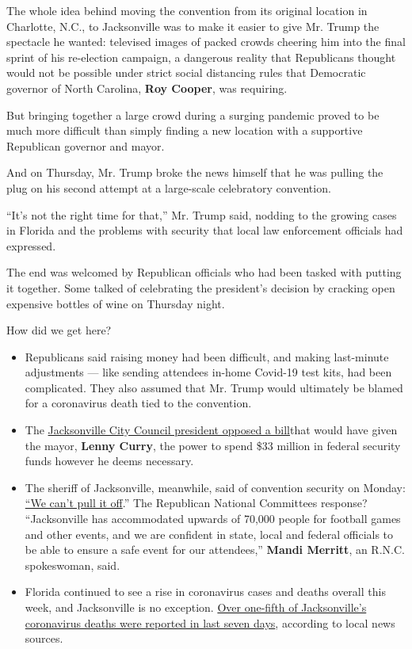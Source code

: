 The whole idea behind moving the convention from its original location
in Charlotte, N.C., to Jacksonville was to make it easier to give Mr.
Trump the spectacle he wanted: televised images of packed crowds
cheering him into the final sprint of his re-election campaign, a
dangerous reality that Republicans thought would not be possible under
strict social distancing rules that Democratic governor of North
Carolina, \textbf{Roy Cooper}, was requiring.

But bringing together a large crowd during a surging pandemic proved to
be much more difficult than simply finding a new location with a
supportive Republican governor and mayor.

And on Thursday, Mr. Trump broke the news himself that he was pulling
the plug on his second attempt at a large-scale celebratory convention.

``It's not the right time for that,'' Mr. Trump said, nodding to the
growing cases in Florida and the problems with security that local law
enforcement officials had expressed.

The end was welcomed by Republican officials who had been tasked with
putting it together. Some talked of celebrating the president's decision
by cracking open expensive bottles of wine on Thursday night.

How did we get here?

\begin{itemize}
\item
  Republicans said raising money had been difficult, and making
  last-minute adjustments --- like sending attendees in-home Covid-19
  test kits, had been complicated. They also assumed that Mr. Trump
  would ultimately be blamed for a coronavirus death tied to the
  convention.
\item
  The
  \href{https://www.jacksonville.com/news/20200722/rnc-plans-in-jeopardy-as-jacksonville-council-president-opposes-city-bill}{Jacksonville
  City Council president opposed a bill}that would have given the mayor,
  \textbf{Lenny Curry}, the power to spend \$33 million in federal
  security funds however he deems necessary.
\item
  The sheriff of Jacksonville, meanwhile, said of convention security on
  Monday:
  \href{https://www.politico.com/states/florida/story/2020/07/20/we-cant-pull-it-off-florida-sheriff-says-he-cant-muster-security-for-gop-convention-1302359}{``We
  can't pull it off}.'' The Republican National Committees response?
  ``Jacksonville has accommodated upwards of 70,000 people for football
  games and other events, and we are confident in state, local and
  federal officials to be able to ensure a safe event for our
  attendees,'' \textbf{Mandi Merritt}, an R.N.C. spokeswoman, said.
\item
  Florida continued to see a rise in coronavirus cases and deaths
  overall this week, and Jacksonville is no exception.
  \href{https://www.news4jax.com/news/florida/2020/07/23/over-one-fifth-of-jacksonvilles-covid-19-deaths-were-reported-in-last-7-days/}{Over
  one-fifth of Jacksonville's coronavirus deaths were reported in last
  seven days}, according to local news sources.
\end{itemize}

